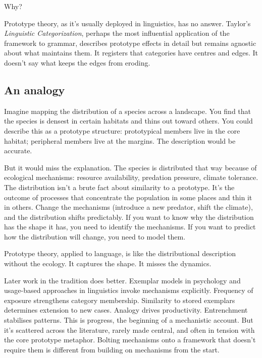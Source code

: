 Why?

Prototype theory, as it's usually deployed in linguistics, has no answer. Taylor's \textit{Linguistic Categorization}, perhaps the most influential application of the framework to grammar, describes prototype effects in detail but remains agnostic about what maintains them. It registers that categories have centres and edges. It doesn't say what keeps the edges from eroding.

\subsection*{An analogy}

Imagine mapping the distribution of a species across a landscape. You find that the species is densest in certain habitats and thins out toward others. You could describe this as a prototype structure: prototypical members live in the core habitat; peripheral members live at the margins. The description would be accurate.

But it would miss the explanation. The species is distributed that way because of ecological mechanisms: resource availability, predation pressure, climate tolerance. The distribution isn't a brute fact about similarity to a prototype. It's the outcome of processes that concentrate the population in some places and thin it in others. Change the mechanisms (introduce a new predator, shift the climate), and the distribution shifts predictably. If you want to know why the distribution has the shape it has, you need to identify the mechanisms. If you want to predict how the distribution will change, you need to model them.

Prototype theory, applied to language, is like the distributional description without the ecology. It captures the shape. It misses the dynamics.

Later work in the tradition does better. Exemplar models in psychology and usage-based approaches in linguistics invoke mechanisms explicitly. Frequency of exposure strengthens category membership. Similarity to stored exemplars determines extension to new cases. Analogy drives productivity. Entrenchment stabilises patterns. This is progress, the beginning of a mechanistic account. But it's scattered across the literature, rarely made central, and often in tension with the core prototype metaphor. Bolting mechanisms onto a framework that doesn't require them is different from building on mechanisms from the start.

